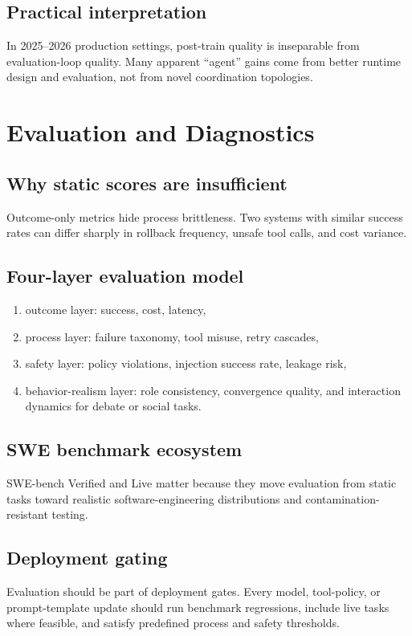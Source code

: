 \documentclass[11pt]{article}
\begin{document}
\subsection{Practical interpretation}
In 2025--2026 production settings, post-train quality is inseparable from evaluation-loop quality. Many apparent ``agent'' gains come from better runtime design and evaluation, not from novel coordination topologies.

\section{Evaluation and Diagnostics}
\subsection{Why static scores are insufficient}
Outcome-only metrics hide process brittleness. Two systems with similar success rates can differ sharply in rollback frequency, unsafe tool calls, and cost variance.

\subsection{Four-layer evaluation model}
\begin{enumerate}[leftmargin=1.2em]
  \item outcome layer: success, cost, latency,
  \item process layer: failure taxonomy, tool misuse, retry cascades,
  \item safety layer: policy violations, injection success rate, leakage risk,
  \item behavior-realism layer: role consistency, convergence quality, and interaction dynamics for debate or social tasks.
\end{enumerate}

\subsection{SWE benchmark ecosystem}
SWE-bench Verified and Live matter because they move evaluation from static tasks toward realistic software-engineering distributions and contamination-resistant testing.

\subsection{Deployment gating}
Evaluation should be part of deployment gates. Every model, tool-policy, or prompt-template update should run benchmark regressions, include live tasks where feasible, and satisfy predefined process and safety thresholds.
\end{document}

